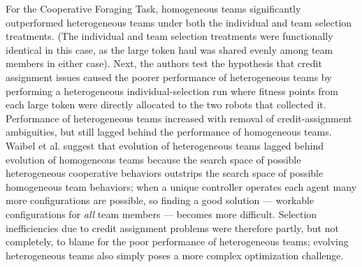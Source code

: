 For the Cooperative Foraging Task, homogeneous teams significantly outperformed heterogeneous teams under both the individual and team selection treatments.
(The individual and team selection treatments were functionally identical in this case, as the large token haul was shared evenly among team members in either case).
Next, the authors test the hypothesis that credit assignment issues caused the poorer performance of heterogeneous teams by performing a heterogeneous individual-selection run where fitness points from each large token were directly allocated to the two robots that collected it.
Performance of heterogeneous teams increased with removal of credit-assignment ambiguities, but still lagged behind the performance of homogeneous teams.
Waibel et al. suggest that evolution of heterogeneous teams lagged behind evolution of homogeneous teams because the search space of possible heterogeneous cooperative behaviors outstrips the search space of possible homogeneous team behaviors; when a unique controller operates each agent many more configurations are possible, so finding a good solution --- workable configurations for \textit{all} team members --- becomes more difficult.
Selection inefficiencies due to credit assignment problems were therefore partly, but not completely, to blame for the poor performance of heterogeneous teams; evolving heterogeneous teams also simply poses a more complex optimization challenge.

